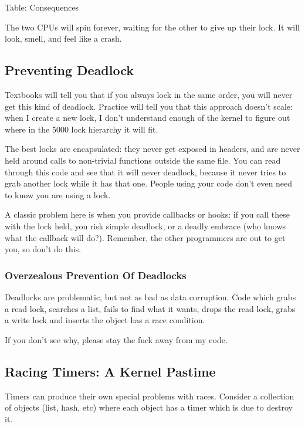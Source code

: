 \documentclass[a4paper,8pt,english]{sphinxmanual}
\begin{document}
Table: Consequences

The two CPUs will spin forever, waiting for the other to give up their
lock. It will look, smell, and feel like a crash.


\subsection{Preventing Deadlock}
\label{kernel-hacking/locking:preventing-deadlock}
Textbooks will tell you that if you always lock in the same order, you
will never get this kind of deadlock. Practice will tell you that this
approach doesn't scale: when I create a new lock, I don't understand
enough of the kernel to figure out where in the 5000 lock hierarchy it
will fit.

The best locks are encapsulated: they never get exposed in headers, and
are never held around calls to non-trivial functions outside the same
file. You can read through this code and see that it will never
deadlock, because it never tries to grab another lock while it has that
one. People using your code don't even need to know you are using a
lock.

A classic problem here is when you provide callbacks or hooks: if you
call these with the lock held, you risk simple deadlock, or a deadly
embrace (who knows what the callback will do?). Remember, the other
programmers are out to get you, so don't do this.


\subsubsection{Overzealous Prevention Of Deadlocks}
\label{kernel-hacking/locking:overzealous-prevention-of-deadlocks}
Deadlocks are problematic, but not as bad as data corruption. Code which
grabs a read lock, searches a list, fails to find what it wants, drops
the read lock, grabs a write lock and inserts the object has a race
condition.

If you don't see why, please stay the fuck away from my code.


\subsection{Racing Timers: A Kernel Pastime}
\label{kernel-hacking/locking:racing-timers-a-kernel-pastime}
Timers can produce their own special problems with races. Consider a
collection of objects (list, hash, etc) where each object has a timer
which is due to destroy it.
\end{document}
